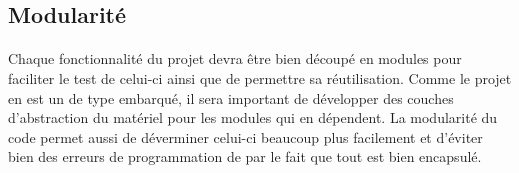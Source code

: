 	\subsection{Modularité}

		\paragraph{}
		Chaque fonctionnalité du projet devra être bien découpé en modules pour faciliter le test de celui-ci ainsi que de permettre sa réutilisation. Comme le projet en est un de type embarqué, il sera important de développer des couches d’abstraction du matériel pour les modules qui en dépendent. La modularité du code permet aussi de déverminer celui-ci beaucoup plus facilement et d’éviter bien des erreurs de programmation de par le fait que tout est bien encapsulé.
